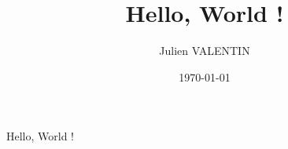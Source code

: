 \documentclass[]{beamer}
\author{Julien VALENTIN}
\date{\today}
\title{Hello, World !}
\begin{document}
\maketitle
Hello, World !
\end{document}
